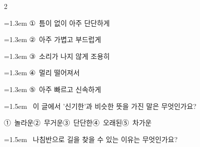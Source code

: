 \documentclass[12pt, a4paper]{article}
\begin{document}
\begin{multicols}{2}
\begin{minipage}{\columnwidth}
\vspace{0.5mm}
{\hangindent=1.3em  \noindent\hspace{0.3em}①~틈이 없이 아주 단단하게\par}
{\hangindent=1.3em  \noindent\hspace{0.3em}②~아주 가볍고 부드럽게\par}
{\hangindent=1.3em  \noindent\hspace{0.3em}③~소리가 나지 않게 조용히\par}
{\hangindent=1.3em  \noindent\hspace{0.3em}④~멀리 떨어져서\par}
{\hangindent=1.3em  \noindent\hspace{0.3em}⑤~아주 빠르고 신속하게\par}
\vspace{4mm}
\end{minipage}
\par

\noindent\begin{minipage}{\columnwidth}
\vspace{2mm}
{\hangindent=1.5em  ~이 글에서 '신기한'과 비슷한 뜻을 가진 말은 무엇인가요?\par}

\vspace{0.5mm}
\noindent
\mbox{①~놀라운}\hspace{1em}\mbox{②~무거운}\hspace{1em}\mbox{③~단단한}\hspace{1em}\mbox{④~오래된}\hspace{1em}\mbox{⑤~차가운}

\vspace{4mm}
\end{minipage}
\par

\noindent\begin{minipage}{\columnwidth}
\vspace{2mm}
{\hangindent=1.5em  ~나침반으로 길을 찾을 수 있는 이유는 무엇인가요?\par}


\end{minipage}
\end{multicols}
\end{document}
